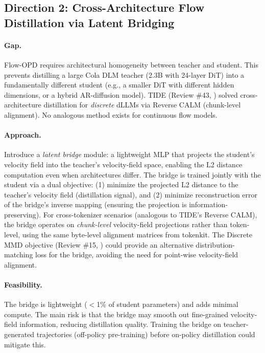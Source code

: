 \documentclass[11pt]{article}
\begin{document}
\subsection{Direction 2: Cross-Architecture Flow Distillation via Latent Bridging}

\paragraph{Gap.}
Flow-OPD requires architectural homogeneity between teacher and student. This prevents distilling a large Cola DLM teacher (2.3B with 24-layer DiT) into a fundamentally different student (e.g., a smaller DiT with different hidden dimensions, or a hybrid AR-diffusion model). TIDE (Review \#43, \cite{tide}) solved cross-architecture distillation for \emph{discrete} dLLMs via Reverse CALM (chunk-level alignment). No analogous method exists for continuous flow models.

\paragraph{Approach.}
Introduce a \emph{latent bridge} module: a lightweight MLP that projects the student's velocity field into the teacher's velocity-field space, enabling the L2 distance computation even when architectures differ. The bridge is trained jointly with the student via a dual objective: (1) minimize the projected L2 distance to the teacher's velocity field (distillation signal), and (2) minimize reconstruction error of the bridge's inverse mapping (ensuring the projection is information-preserving). For cross-tokenizer scenarios (analogous to TIDE's Reverse CALM), the bridge operates on \emph{chunk-level} velocity-field projections rather than token-level, using the same byte-level alignment matrices from tokenkit. The Discrete MMD objective (Review \#15, \cite{discretemmd}) could provide an alternative distribution-matching loss for the bridge, avoiding the need for point-wise velocity-field alignment.

\paragraph{Feasibility.}
The bridge is lightweight ($<$1\% of student parameters) and adds minimal compute. The main risk is that the bridge may smooth out fine-grained velocity-field information, reducing distillation quality. Training the bridge on teacher-generated trajectories (off-policy pre-training) before on-policy distillation could mitigate this.
\end{document}
